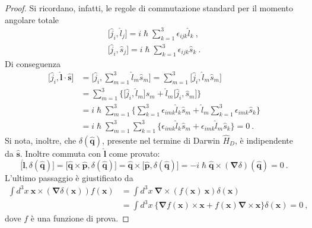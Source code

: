 \documentclass[12pt,a4paper]{report}
\numberwithin{equation}{section}
\numberwithin{section}{chapter}
\begin{document}
\begin{proof}
	Si ricordano, infatti, le regole di commutazione standard per il momento angolare totale
	\begin{subequations}
		\begin{align}
		\bigg[\widehat{j}_i, \widehat{l}_j\bigg] = i\hslash\sum_{k=1}^{3}\epsilon_{ijk}\widehat{l}_k~,\label{impteo6:first}\\
		\bigg[\widehat{j}_i, \widehat{s}_j\bigg] = i\hslash\sum_{k=1}^{3}\epsilon_{ijk}\widehat{s}_k~.\label{impteo6:second}
		\end{align}
	\end{subequations}
	Di conseguenza
	\begin{align}
	\label{impteo7}
	\bigg[\widehat{j}_i, \widehat{\boldsymbol{l}}\cdot\widehat{\boldsymbol{s}}\bigg] &= \bigg[\widehat{j}_i, \sum_{m=1}^{3}\widehat{l}_m\widehat{s}_m\bigg] = \sum_{m=1}^{3} \bigg[\widehat{j}_i, \widehat{l}_m\widehat{s}_m\bigg]\\
	&= \sum_{m=1}^{3} \bigg\lbrace\bigg[\widehat{j}_i, \widehat{l}_m\bigg]\widehat{s}_m + \widehat{l}_m\bigg[\widehat{j}_i, \widehat{s}_m\bigg]\bigg\rbrace\nonumber\\
	&= i\hslash\sum_{m=1}^{3} \bigg\lbrace \sum_{k=1}^{3}\epsilon_{imk}\widehat{l}_k\widehat{s}_m + \widehat{l}_m\sum_{k=1}^{3}\epsilon_{imk} \widehat{s}_k\bigg\rbrace\nonumber\\
	&= i\hslash\sum_{m=1}^{3}\sum_{k=1}^{3} \bigg\lbrace \epsilon_{imk}\widehat{l}_k\widehat{s}_m + \epsilon_{imk}\widehat{l}_m\widehat{s}_k\bigg\rbrace = 0~.\nonumber
	\end{align}
	Si nota, inoltre, che $\delta(\widehat{\boldsymbol{q}})$, presente nel termine di Darwin $\widehat{H}_D$, \`e indipendente da $\widehat{\boldsymbol{s}}$. Inoltre commuta con $\widehat{\boldsymbol{l}}$ come provato:
	\begin{equation}
	\label{impteo8}
	\big[\widehat{\boldsymbol{l}}, \delta(\widehat{\boldsymbol{q}})\big] = \big[\widehat{\boldsymbol{q}} \times \widehat{\boldsymbol{p}}, \delta(\widehat{\boldsymbol{q}})\big] = \widehat{\boldsymbol{q}} \times \big[\widehat{\boldsymbol{p}}, \delta(\widehat{\boldsymbol{q}})\big] = -i\hslash\widehat{\boldsymbol{q}} \times (\boldsymbol{\nabla}\delta)(\widehat{\boldsymbol{q}}) = 0~.
	\end{equation}
	L'ultimo passaggio \`e giustificato da
	\begin{align}
	\label{impteo9}
	\int d^3x~\boldsymbol{x} \times (\boldsymbol{\nabla}\delta(\boldsymbol{x}))f(\boldsymbol{x}) &= \int d^3x~\boldsymbol{\nabla} \times (f(\boldsymbol{x})~\boldsymbol{x}) \delta(\boldsymbol{x})\\
	&=\int d^3x~\lbrace \boldsymbol{\nabla}f(\boldsymbol{x}) \times \boldsymbol{x} + f(\boldsymbol{x})\boldsymbol{\nabla} \times \boldsymbol{x}\rbrace \delta(\boldsymbol{x}) = 0~,\nonumber
	\end{align}
	dove $f$ \`e una funzione di prova.
	\end{proof}
\end{document}
